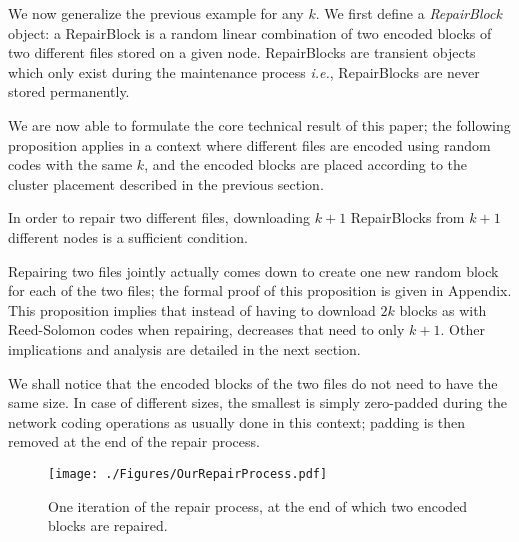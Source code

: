 We now generalize the previous example for any $k$. We first define a \textit{RepairBlock} object: a RepairBlock is a random linear combination of two encoded blocks of two different files stored on a given node. RepairBlocks are transient objects which only exist during the maintenance process \emph{i.e.}, RepairBlocks are never stored permanently.

We are now able to formulate the core technical result of this paper; the
following proposition applies in a context where different files are
encoded using random codes with the same $k$, and the encoded blocks
are placed according to the cluster placement described in the
previous section.

\begin{prop} 
\label{prop1}
In order to repair two different files, downloading $k+1$ RepairBlocks
from $k+1$ different nodes is a sufficient condition.
\end{prop}

Repairing two files jointly actually comes down to create one new
random block for each of the two files; the formal proof of this
proposition is given in Appendix. This proposition implies that
instead of having to download $2k$ blocks as with Reed-Solomon codes
when repairing, \crc decreases that need to
only $k+1$.  Other implications and analysis are detailed in the next section.

We shall notice that the encoded blocks of the two files do not need to have the same size. In case of different sizes, the smallest is simply zero-padded during the network coding operations as usually done in this context; padding is then removed at the end of the repair process.



\begin{figure}[t] 
\vspace{-0.5cm}
 \begin{center}    
 \texttt{[image: ./Figures/OurRepairProcess.pdf]} 
    \caption{One iteration of the repair process, at the end of which two encoded blocks are repaired.}   
    \label{ourRepairProcess}   
  \end{center}     
   \end{figure}

